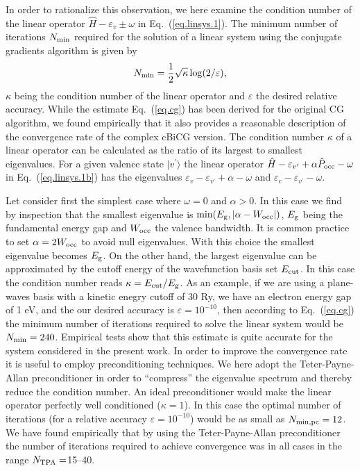 \documentclass[twocolumn,prb,showpacs,superscriptaddress]{revtex4}
\def\w{\omega}
\def\>{\rangle}
\def\H{\hat{H}}
\def\P{\hat{P}_{\rm occ}}
\def\E{\varepsilon}
\def\vp{{v^\prime}}
\begin{document}
In order to rationalize this observation, we here examine
the condition number of the linear operator $\H-\E_v\pm\w$ in Eq.\ (\ref{eq.linsys.1}).
The minimum number of iterations $N_{\rm min}$ required for the solution of
a linear system using the conjugate gradients algorithm is given by
  \begin{equation}\label{eq.cg}
  N_{\rm min} = \frac{1}{2}\sqrt{\kappa} \log(2/\varepsilon),
  \end{equation}
$\kappa$ being the condition number of the linear operator and $\varepsilon$ the
desired relative accuracy.\cite{golub} 
While the estimate Eq.~(\ref{eq.cg}) has
been derived for the original CG algorithm, we found empirically that it also 
provides a reasonable description of the convergence rate of the complex cBiCG version.
The condition number $\kappa$ of a linear operator can be calculated as the ratio 
of its largest to smallest eigenvalues.
For a given valence state 
$|v^\prime\>$ the linear operator $\H - \E_\vp + \alpha \P - \w$ 
in Eq.\ (\ref{eq.linsys.1b}) has the eigenvalues
$\E_v - \E_\vp + \alpha - \w$ and $\E_c - \E_\vp - \w$. 

Let consider first the simplest case where $\w=0$ and $\alpha>0$. In this case 
we find by inspection that the smallest eigenvalue is $\min(E_{\rm g}, |\alpha-W_{\rm occ}|)$, 
$E_{\rm g}$ being the fundamental energy gap and $W_{\rm occ}$ the valence bandwidth.
It is common practice to set $\alpha=2W_{\rm occ}$ to avoid null eigenvalues.
\cite{baroni.rmp} With this choice the smallest eigenvalue becomes $E_{\rm g}$.
On the other hand, the largest eigenvalue can be approximated by the
cutoff energy of the wavefunction basis set $E_{\rm cut}$.
In this case the condition number reads $\kappa = E_{\rm cut}/E_{\rm g}$.
As an example, if we are using a plane-waves basis with a kinetic enegry
cutoff of 30 Ry, we have an electron energy gap of 1 eV, 
and the our desired accuracy is $\varepsilon=10^{-10}$, then according to
Eq.\ (\ref{eq.cg}) the minimum number of iterations required to solve 
the linear system would be $N_{\rm min} = 240$. Empirical tests show that 
this estimate is quite accurate for the system considered in the present work.
In order to improve the convergence rate it is useful to employ preconditioning
techniques. We here adopt the Teter-Payne-Allan preconditioner\cite{tpa}
in order to ``compress'' the eigenvalue spectrum and thereby reduce the
condition number. An ideal preconditioner would make the linear operator
perfectly well conditioned ($\kappa=1$). In this case
the optimal  number of iterations (for a relative accuracy $\varepsilon=10^{-10}$) 
would be as small as $N_{\rm min,pc} = 12$. We have found empirically
that by using the Teter-Payne-Allan 
preconditioner the number of iterations
required to achieve convergence was in all cases in the range $N_{\rm TPA}=$15--40. 
\end{document}
